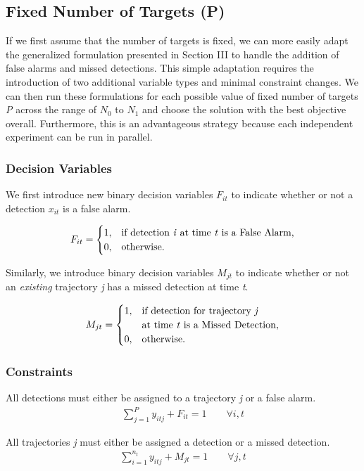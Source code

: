 \documentclass[journal]{IEEEtran}
\begin{document}
\subsection{Fixed Number of Targets (P)}
If we first assume that the number of targets is fixed, we can more easily adapt the generalized formulation presented in Section III to handle the addition of false alarms and missed detections. This simple adaptation requires the introduction of two additional variable types and minimal constraint changes. We can then run these formulations for each possible value of fixed number of targets \textit{P} across the range of $N_{0}$ to $N_{1}$ and choose the solution with the best objective overall. Furthermore, this is an advantageous strategy because each independent experiment can be run in parallel. 

\subsubsection{Decision Variables}
We first introduce new binary decision variables $F_{it}$ to indicate whether or not a detection $x_{it}$ is a false alarm. 

\[F_{it} = 
\begin{cases}
1, & \text{if detection \textit{i} at time \textit{t} is a False Alarm,}\\
0, & \text{otherwise.}
\end{cases}\]

Similarly, we introduce binary decision variables $M_{jt}$ to indicate whether or not an \textit{existing} trajectory \textit{j} has a missed detection at time \textit{t}.

\[M_{jt} =
\begin{cases}
1, & \text{if detection for trajectory \textit{j}}\\
   &\text{at time \textit{t} is a Missed Detection,}\\
0, & \text{otherwise.}
\end{cases}\]

\subsubsection{Constraints}
All detections must either be assigned to a trajectory \textit{j} or a false alarm. 
\begin{align}\label{eqn: FA Simple}
\sum_{j=1}^{P} y_{itj} + F_{it} = 1 \qquad \forall i,t
\end{align}

All trajectories \textit{j} must either be assigned a detection or a missed detection. 
\begin{align}
\sum_{i=1}^{n_{t}} y_{itj} + M_{jt} = 1 \qquad \forall j,t
\end{align}
\end{document}
